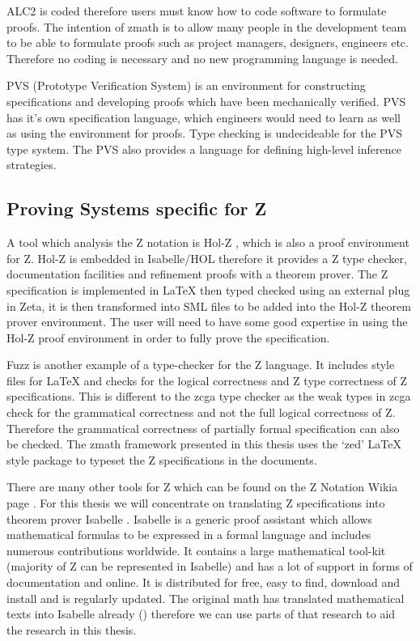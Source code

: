 ALC2 is coded therefore users must know how to code software to formulate proofs. The intention of \gls{zmath} is to allow many people in the development team to be able to formulate proofs such as project managers, designers, engineers etc. Therefore no coding is necessary and no new programming language is needed.

PVS (Prototype Verification System) \cite{pvs} is an environment for constructing specifications and developing proofs which have been mechanically verified. PVS has it's own specification language, which engineers would need to learn as well as using the environment for proofs. Type checking is undecideable for the PVS type system. The PVS also provides a language for defining high-level inference strategies.


\subsection{Proving Systems specific for Z}
\label{subsec:provingSystemsForZ}

A tool which analysis the Z notation is Hol-Z \cite{hol-z}, which is also a proof environment for Z. Hol-Z is embedded in Isabelle/HOL therefore it provides a Z type checker, documentation facilities and refinement proofs with a theorem prover. The Z specification is implemented in \LaTeX{} then typed checked using an external plug in Zeta, it is then transformed into SML files to be added into the Hol-Z theorem prover environment. The user will need to have some good expertise in using the Hol-Z proof environment in order to fully prove the specification.

Fuzz \cite{spiveyfuzz} is another example of a type-checker for the Z language. It includes style files for \LaTeX{} and checks for the logical correctness and Z type correctness of Z specifications. This is different to the \gls{zcga} type checker as the weak types in \gls{zcga} check for the grammatical correctness and not the full logical correctness of Z. Therefore the grammatical correctness of partially formal specification can also be checked. The \gls{zmath} framework presented in this thesis uses the `zed' \LaTeX{} style package to typeset the Z specifications in the documents.

There are many other tools for Z which can be found on the Z Notation Wikia page \cite{zwikia}. For this thesis we will concentrate on translating Z specifications into theorem prover Isabelle \cite{isabelle}. Isabelle is a generic proof assistant which allows mathematical formulas to be expressed in a formal language and includes numerous contributions worldwide. It contains a large mathematical tool-kit (majority of Z can be represented in Isabelle) and has a lot of support in forms of documentation and online. It is distributed for free, easy to find, download and install and is regularly updated. The original \gls{math} has translated mathematical texts into Isabelle already (\cite{mathintoisa}) therefore we can use parts of that research to aid the research in this thesis.

